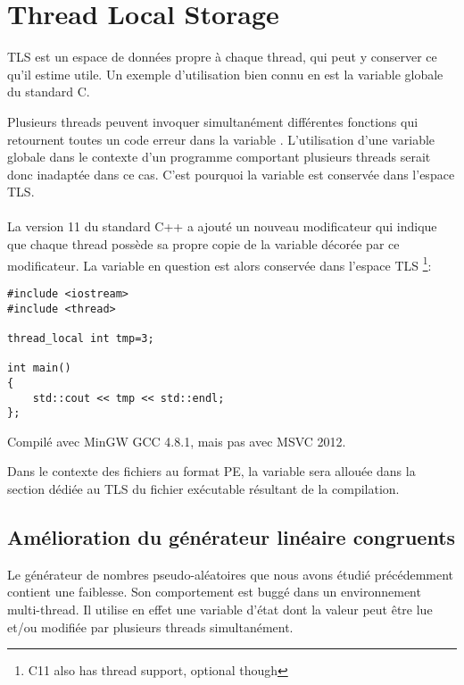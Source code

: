 ﻿\section{Thread Local Storage}
\label{TLS}

TLS est un espace de données propre à chaque thread, qui peut y conserver ce qu'il estime utile.
Un exemple d'utilisation bien connu en est la variable globale  du standard C.

Plusieurs threads peuvent invoquer simultanément différentes fonctions qui retournent toutes un code 
erreur dans la variable . L'utilisation d'une variable globale dans le contexte d'un 
programme comportant plusieurs threads serait donc inadaptée dans ce cas. C'est pourquoi la variable 
 est conservée dans l'espace \ac{TLS}.\\
\\
La version 11 du standard C++ a ajouté un nouveau modificateur  qui indique que 
chaque thread possède sa propre copie de la variable décorée par ce modificateur. La variable en 
question est alors conservée dans l'espace \ac{TLS}
\footnote{ C11 also has thread support, optional though}:

\begin{lstlisting}[caption=C++11,style=customc]
#include <iostream>
#include <thread>

thread_local int tmp=3;

int main()
{
	std::cout << tmp << std::endl;
};
\end{lstlisting}

Compilé avec MinGW GCC 4.8.1, mais pas avec MSVC 2012.

Dans le contexte des fichiers au format PE, la variable  sera allouée dans la section dédiée 
au \ac{TLS} du fichier exécutable résultant de la compilation.

\subsection{Amélioration du générateur linéaire congruents}
\label{LCG_TLS}

Le générateur de nombres pseudo-aléatoires  que nous avons étudié précédemment 
contient une faiblesse. Son comportement est buggé dans un environnement multi-thread. Il utilise 
en effet une variable d'état dont la valeur peut être lue et/ou modifiée par plusieurs threads 
simultanément.




